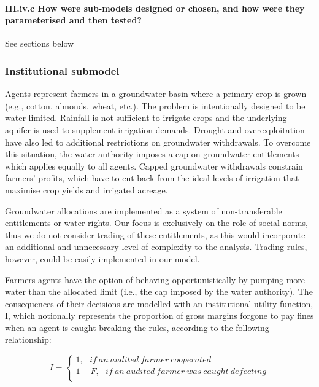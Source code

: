 \documentclass[12pt, a4paper]{article}
\begin{document}
\paragraph{III.iv.c How were sub-models designed or chosen, and how were they parameterised and then tested?}

See sections below

\subsubsection{Institutional submodel}

Agents represent farmers in a groundwater basin where a primary crop is grown (e.g., cotton, almonds, wheat, etc.). The problem is intentionally designed to be water-limited. Rainfall is not sufficient to irrigate crops and the underlying aquifer is used to supplement irrigation demands. Drought and overexploitation have also led to additional restrictions on groundwater withdrawals. To overcome this situation, the water authority imposes a cap on groundwater entitlements which applies equally to all agents. Capped groundwater withdrawals constrain farmers’ profits, which have to cut back from the ideal levels of irrigation that maximise crop yields and irrigated acreage. 

Groundwater allocations are implemented as a system of non-transferable entitlements or water rights. Our focus is exclusively on the role of social norms, thus we do not consider trading of these entitlements, as this would incorporate an additional and unnecessary level of complexity to the analysis. Trading rules, however, could be easily implemented in our model. 

Farmers agents have the option of behaving opportunistically by pumping more water than the allocated limit (i.e., the cap imposed by the water authority). The consequences of their decisions are modelled with an institutional utility function, I, which notionally represents the proportion of gross margins forgone to pay fines when an agent is caught breaking the rules, according to the following relationship:

\begin{equation} I = \left\{ \begin{matrix} 1,\ \ \ if\ an\ audited\ farmer\ cooperated \\ 1 - F,\ \ \ if\ an\ audited\ farmer\ was\ caught\ defecting \\ \end{matrix} \end{equation}
\end{document}
